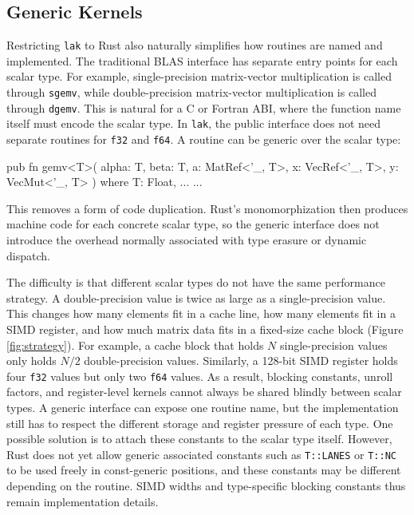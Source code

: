 \documentclass[11pt]{article}
\begin{document}
\subsection{Generic Kernels}

Restricting \texttt{lak} to Rust also naturally simplifies how routines are named and
implemented. The traditional BLAS interface has separate entry points for each
scalar type. For example, single-precision matrix-vector multiplication is
called through \texttt{sgemv}, while double-precision matrix-vector
multiplication is called through \texttt{dgemv}. This is natural for a C or
Fortran ABI, where the function name itself must encode the scalar type.
In \texttt{lak}, the public interface does not need separate routines for
\texttt{f32} and \texttt{f64}. A routine can be generic
over the scalar type:

\begin{rust}
pub fn gemv<T>(
    alpha: T, 
    beta: T, 
    a: MatRef<'_, T>, 
    x: VecRef<'_, T>, 
    y: VecMut<'_, T>
)
where
    T: Float,
    ...
{
    ...
}
\end{rust}

This removes a form of code duplication. Rust's 
monomorphization then produces machine code for each concrete
scalar type, so the generic interface does not introduce the overhead normally
associated with type erasure or dynamic dispatch. 

The difficulty is that different scalar types do not have the same performance
strategy. A double-precision value is twice as large as a single-precision value.
This changes how many elements fit in a cache line, how many elements fit in a SIMD
register, and how much matrix data fits in a fixed-size cache block (Figure \ref{fig:strategy}). For example, a cache block that holds \(N\) single-precision values only holds
\(N/2\) double-precision values. Similarly, a 128-bit SIMD register holds four
\texttt{f32} values but only two \texttt{f64} values. As a result, blocking
constants, unroll factors, and register-level kernels cannot always be shared
blindly between scalar types. A generic interface can expose one routine name,
but the implementation still has to respect the different storage and register
pressure of each type. One possible solution is to attach these constants to the scalar type itself.
However, Rust does not yet allow generic associated constants such as
\texttt{T::LANES} or \texttt{T::NC} to be used freely in const-generic
positions, and these constants may be different depending on the routine. SIMD widths and type-specific blocking constants thus remain implementation details.
\end{document}
